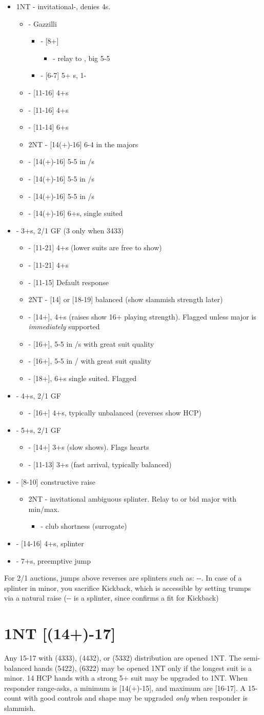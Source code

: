 \documentclass[12pt]{report}
\newcommand{\ul}[1]{\begin{itemize}#1\end{itemize}}
\newcommand{\li}{\item[~]}
\newcommand{\bidsection}[2]{\section{\texorpdfstring{#1}{#2}}}
\begin{document}
    \ul {
        \li 1NT - invitational-, denies 4\sp{}s.
        \ul {
            \li \cl2 - Gazzilli
            \ul {
                \li \di2 - [8+]
                \ul {
                    \li \he2 - relay to \sp2, big 5-5
                }
                \li \he2 - [6-7] 5+ \he{}s, 1-\sp{}
            }
            \li \di2 - [11-16] 4+\di{}s
            \li \he2 - [11-16] 4+\he{}s
            \li \sp2 - [11-14] 6+\sp{}s
            \li 2NT - [14(+)-16] 6-4 in the majors
            \li \cl3 - [14(+)-16] 5-5 in \cl{}/\sp{}s
            \li \di3 - [14(+)-16] 5-5 in \di{}/\sp{}s
            \li \he3 - [14(+)-16] 5-5 in \he{}/\sp{}s
            \li \sp3 - [14(+)-16] 6+\sp{}s, single suited
        }
        \li \cl2 - 3+\cl{}s, 2/1 GF (3 only when 3433)
        \ul {
            \li \di2 - [11-21] 4+\di{}s (lower suits are free to show)
            \li \he2 - [11-21] 4+\he{}s
            \li \sp2 - [11-15] Default response
            \li 2NT - [14] or [18-19] balanced (show slammish strength later)
            \li \cl3 - [14+], 4+\cl{}s (raises show 16+ playing strength).  Flagged unless major is \textit{immediately} supported
            \li \di3 - [16+], 5-5 in \di{}/\sp{}s with great suit quality
            \li \he3 - [16+], 5-5 in \he{}/\sp{} with great suit quality
            \li \sp3 - [18+], 6+\sp{}s single suited.  Flagged
        }
        \li \di2 - 4+\di{}s, 2/1 GF
        \ul {
            \li \cl3 - [16+] 4+\cl{}s, typically unbalanced (reverses show HCP)
        }
        \li \he2 - 5+\he{}s, 2/1 GF
        \ul {
            \li \he3 - [14+] 3+\he{}s (slow shows).  Flags hearts
            \li \he4 - [11-13] 3+\he{}s (fast arrival, typically balanced)
        }
        \li \sp2 - [8-10] constructive raise
        \ul {
            \li 2NT - invitational ambiguous splinter.  Relay to \cl3 or bid major with min/max.
            \ul {
                \li \cl3- club shortness (surrogate)
            }
        }
        \li \he3 - [14-16] 4+\sp{}s, splinter
        \li \he4 - 7+\he{}s, preemptive jump
    }

    For 2/1 auctions, jumps above reverses are splinters such as: --.  In case of a splinter in minor, you sacrifice Kickback, which is accessible by setting trumps via a natural raise (-- is a splinter, since  confirms a fit for Kickback)
\newpage

\bidsection{1NT [(14+)-17]}{1NT [(14+)-17]} \label{2:6}

    Any 15-17 with (4333), (4432), or (5332) distribution are opened 1NT.  The semi-balanced hands (5422), (6322) may be opened 1NT only if the longest suit is a minor. 14 HCP hands with a strong 5+ suit may be upgraded to 1NT.  When responder range-asks, a minimum is [14(+)-15], and maximum are [16-17].  A 15-count with good controls and shape may be upgraded \textit{only} when responder is slammish.
    \\
\end{document}
